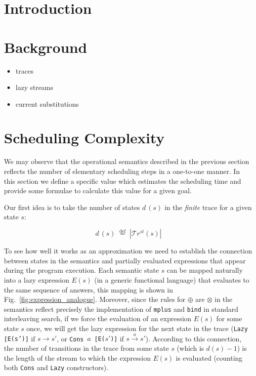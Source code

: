 \documentclass[acmsmall, anonymous, review]{acmart}
\newcommand{\eqdef}{\overset{\mathrm{def}}{=}}
\newcommand{\lazystream}[1]{\texttt{Lazy [{#1}]}}
\newcommand{\consstream}[2]{\texttt{Cons #1 [{#2}]}}
\newcommand{\trs}[1]{\mathcal{T}r^{st}(#1)}
\newcommand{\expranalog}[1]{E(#1)}
\begin{document}
\maketitle

\section{Introduction}

\section{Background}

\begin{itemize}
    \item traces
    \item lazy streams
    \item current substitutions
\end{itemize}

\section{Scheduling Complexity}

We may observe that the operational semantics described in the previous section reflects the number of elementary scheduling steps in a one-to-one manner.
In this section we define a specific value which estimates the scheduling time and provide some formulae to calculate this value for a given goal.

Our first idea is to take the number of states $d\,(s)$ in the \emph{finite} trace for a given state $s$:

\[ d\,(s) \; \eqdef \; | \trs{s} |  \]

To see how well it works as an approximation we need to establish the connection between states in the semantics and partially evaluated expressions that appear during the program execution. Each semantic state $s$ can be mapped naturally into a lazy expression $\expranalog{s}$ (in a generic functional language) that evaluates to the same sequence of answers, this mapping is shown in Fig.~\ref{fig:expression_analogue}. Moreover, since the rules for $\oplus$ are $\otimes$ in the semantics reflect precisely the implementation of \texttt{mplus} and \texttt{bind} in standard interleaving search, if we force the evaluation of an expression $\expranalog{s}$ for some state $s$ once, we will get the lazy expression for the next state in the trace (\lazystream{\expranalog{s'}} if $s \rightarrow s'$, or \consstream{$a$}{\expranalog{$s'$}} if $s \xrightarrow{a} s'$). According to this connection, the number of transitions in the trace from some state $s$ (which is $d(s) - 1$) is the length of the stream to which the expression $\expranalog{s}$ is evaluated (counting both \texttt{Cons} and \texttt{Lazy} constructors).
\end{document}
